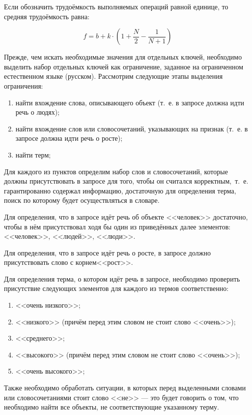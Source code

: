 Если обозначить трудоёмкость выполняемых операций равной единице, то средняя трудоёмкость равна:

\begin{equation}
	f = b + k \cdot \left(1 + \frac{N}{2} - \frac{1}{N + 1}\right)
\end{equation}

Прежде, чем искать необходимые значения для отдельных ключей, необходимо выделить набор отдельных ключей как ограничение, заданное на ограниченном естественном языке (русском). 
Рассмотрим следующие этапы выделения ограничения:
\begin{enumerate}[label=\arabic*)]
	\item найти вхождение слова, описывающего объект (т.~е. в запросе должна идти речь о людях);
	\item найти вхождение слов или словосочетаний, указывающих на признак (т.~е. в запросе должна идти речь о росте);
	\item найти терм;
 \end{enumerate}

Для каждого из пунктов определим набор слов и словосочетаний, которые должны присутствовать в запросе для того, чтобы он считался корректным,~т.~е. гарантированно содержал информацию, достаточную для определения терма, поиск по которому будет осуществляться в словаре.

Для определения, что в запросе идёт речь об объекте <<человек>> достаточно, чтобы в нём присутствовал ходя бы один из приведённых далее элементов: <<человек>>, <<людей>>, <<люди>>.

Для определения, что в запросе идёт речь о росте, в запросе должно присутствовать слово с корнем<<рост>>.

Для определения терма, о котором идёт речь в запросе, необходимо проверить присутствие следующих элементов для каждого из термов соответственно:
\begin{enumerate}[label=\arabic*)]
	\item <<очень низкого>>;
	\item <<низкого>> (причём перед этим словом не стоит слово <<очень>>);
	\item <<среднего>>;
	\item <<высокого>> (причём перед этим словом не стоит слово <<очень>>);
	\item <<очень высокого>>;
\end{enumerate}

Также необходимо обработать ситуации, в которых перед выделенными словами или словосочетаниями стоит слово <<не>> --- это будет говорить о том, что необходимо найти все объекты, не соответствующие указанному терму.

